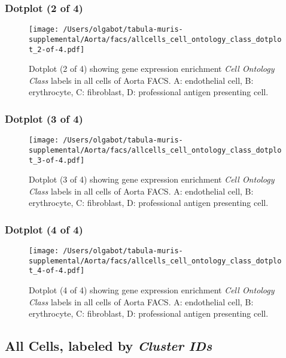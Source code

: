 \clearpage

\subsubsection{Dotplot (2 of 4)}
\begin{figure}[h]
\centering
\texttt{[image: /Users/olgabot/tabula-muris-supplemental/Aorta/facs/allcells\_cell\_ontology\_class\_dotplot\_2-of-4.pdf]}

\caption{ Dotplot (2 of 4)  showing gene expression enrichment \emph{Cell Ontology Class} labels in all cells of Aorta FACS. A: endothelial cell, B: erythrocyte, C: fibroblast, D: professional antigen presenting cell.}
\end{figure}


\clearpage

\subsubsection{Dotplot (3 of 4)}
\begin{figure}[h]
\centering
\texttt{[image: /Users/olgabot/tabula-muris-supplemental/Aorta/facs/allcells\_cell\_ontology\_class\_dotplot\_3-of-4.pdf]}

\caption{ Dotplot (3 of 4)  showing gene expression enrichment \emph{Cell Ontology Class} labels in all cells of Aorta FACS. A: endothelial cell, B: erythrocyte, C: fibroblast, D: professional antigen presenting cell.}
\end{figure}


\clearpage

\subsubsection{Dotplot (4 of 4)}
\begin{figure}[h]
\centering
\texttt{[image: /Users/olgabot/tabula-muris-supplemental/Aorta/facs/allcells\_cell\_ontology\_class\_dotplot\_4-of-4.pdf]}

\caption{ Dotplot (4 of 4)  showing gene expression enrichment \emph{Cell Ontology Class} labels in all cells of Aorta FACS. A: endothelial cell, B: erythrocyte, C: fibroblast, D: professional antigen presenting cell.}
\end{figure}


\clearpage

\subsection{All Cells, labeled by \emph{Cluster IDs}}
